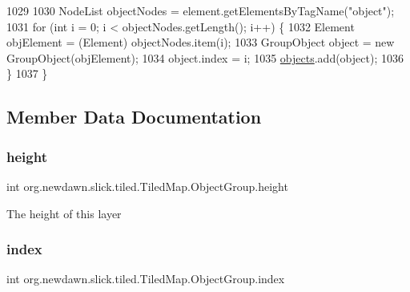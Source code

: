 \begin{DoxyCode}
1029 
1030             NodeList objectNodes = element.getElementsByTagName(\textcolor{stringliteral}{"object"});
1031             \textcolor{keywordflow}{for} (\textcolor{keywordtype}{int} i = 0; i < objectNodes.getLength(); i++) \{
1032                 Element objElement = (Element) objectNodes.item(i);
1033                 GroupObject \textcolor{keywordtype}{object} = \textcolor{keyword}{new} GroupObject(objElement);
1034                 \textcolor{keywordtype}{object}.index = i;
1035                 \mbox{\hyperlink{classorg_1_1newdawn_1_1slick_1_1tiled_1_1_tiled_map_1_1_object_group_ab11d113b64b9555b7f9e4fb1b2ceccae}{objects}}.add(\textcolor{keywordtype}{object});
1036             \}
1037         \}
\end{DoxyCode}


\subsection{Member Data Documentation}
\mbox{\label{classorg_1_1newdawn_1_1slick_1_1tiled_1_1_tiled_map_1_1_object_group_a645fa921dd9c7a684e13b513c00072b7}} 
\subsubsection{\texorpdfstring{height}{height}}
{\footnotesize\ttfamily int org.\+newdawn.\+slick.\+tiled.\+Tiled\+Map.\+Object\+Group.\+height}

The height of this layer \mbox{\label{classorg_1_1newdawn_1_1slick_1_1tiled_1_1_tiled_map_1_1_object_group_a3f12f222fefae365181b2fc1b9a3ec33}} 
\subsubsection{\texorpdfstring{index}{index}}
{\footnotesize\ttfamily int org.\+newdawn.\+slick.\+tiled.\+Tiled\+Map.\+Object\+Group.\+index}

